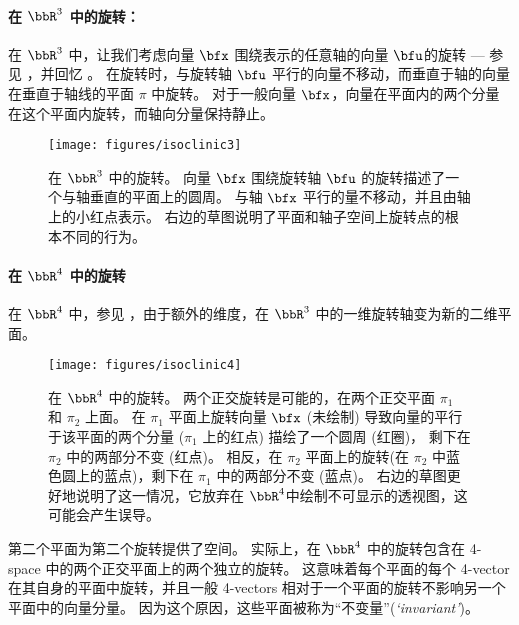 \paragraph{在 $\bbR^3$ 中的旋转：} 
%
在 $\bbR^3$ 中，让我们考虑向量 $\bfx$ 围绕表示的任意轴的向量 $\bfu$的旋转 --- 参见 ，并回忆 。
在旋转时，与旋转轴 $\bfu$ 平行的向量不移动，而垂直于轴的向量在垂直于轴线的平面 $\pi$ 中旋转。 
对于一般向量 $\bfx$，向量在平面内的两个分量在这个平面内旋转，而轴向分量保持静止。
%
\begin{figure}[tb]
\begin{center}
\texttt{[image: figures/isoclinic3]}
\caption{%
在 $\bbR^3$ 中的旋转。 
向量 $\bfx$ 围绕旋转轴 $\bfu$ 的旋转描述了一个与轴垂直的平面上的圆周。 
与轴 $\bfx$ 平行的量不移动，并且由轴上的小红点表示。
右边的草图说明了平面和轴子空间上旋转点的根本不同的行为。 
}
\label{fig:isoclinic3}
\end{center}
\end{figure}


\paragraph{在 $\bbR^4$ 中的旋转} 
%
在 $\bbR^4$ 中，参见 ，由于额外的维度，在 $\bbR^3$ 中的一维旋转轴变为新的二维平面。
%
\begin{figure}[tb]
\begin{center}
\texttt{[image: figures/isoclinic4]}
\caption{%
在 $\bbR^4$ 中的旋转。 
两个正交旋转是可能的，在两个正交平面 $\pi_1$ 和 $\pi_2$ 上面。 
在 $\pi_1$ 平面上旋转向量 $\bfx$ (未绘制) 导致向量的平行于该平面的两个分量 ($\pi_1$ 上的红点) 描绘了一个圆周 (红圈)，
剩下在 $\pi_2$ 中的两部分不变 (红点)。
相反，在 $\pi_2$ 平面上的旋转(在 $\pi_2$ 中蓝色圆上的蓝点)，剩下在 $\pi_1$ 中的两部分不变 (蓝点)。
右边的草图更好地说明了这一情况，它放弃在 $\bbR^4$中绘制不可显示的透视图，这可能会产生误导。
}
\label{fig:isoclinic4}
\end{center}
\end{figure}
%
第二个平面为第二个旋转提供了空间。
实际上，在 $\bbR^4$ 中的旋转包含在 4-space 中的两个正交平面上的两个独立的旋转。 
这意味着每个平面的每个 4-vector 在其自身的平面中旋转，并且一般 4-vectors 相对于一个平面的旋转不影响另一个平面中的向量分量。 
因为这个原因，这些平面被称为“不变量”(\emph{`invariant'})。

